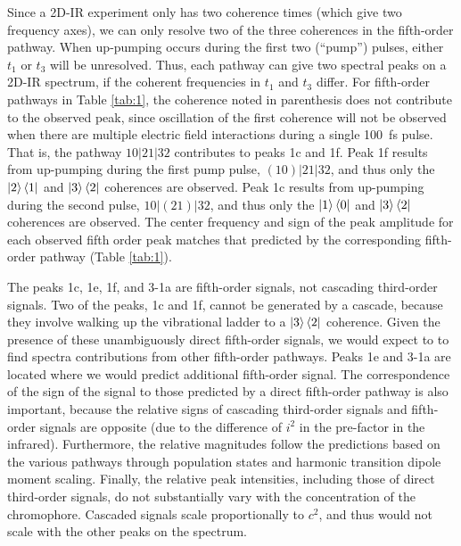 \documentclass[%
  class = book,%
  crop = false,%
  float = true,%
  multi = true,%
  preview = false,%
]{standalone}
\begin{document}
{Since a 2D-IR experiment only has two coherence times (which give two frequency axes), we can only resolve two of the three coherences in the fifth-order pathway. When up-pumping occurs during the first two (``pump'') pulses, either \(t_1\) or \(t_3\) will be unresolved. Thus, each pathway can give two spectral peaks on a 2D-IR spectrum, if the coherent frequencies in \(t_1\) and \(t_3\) differ.  For fifth-order pathways in Table \ref{tab:1}, the coherence noted in parenthesis does not contribute to the observed peak, since oscillation of the first coherence will not be observed when there are multiple electric field interactions during a single \SI{100}{\fs} pulse. That is, the pathway \(10|21|32\) contributes to peaks 1c and 1f. Peak 1f results from up-pumping during the first pump pulse, \(\left(10\right)|21|32\), and thus only the \(\ket{2}\bra{1}\) and \(\ket{3}\bra{2}\) coherences are observed. Peak 1c results from up-pumping during the second pulse, \(10|\left(21\right)|32\), and thus only the \(\ket{1}\bra{0}\) and \(\ket{3}\bra{2}\) coherences are observed. The center frequency and sign of the peak amplitude for each observed fifth order peak matches that predicted by the corresponding fifth-order pathway (Table \ref{tab:1}).

The peaks 1c, 1e, 1f, and 3-1a are fifth-order signals, not cascading third-order signals. Two of the peaks, 1c and 1f, cannot be generated by a cascade, because they involve walking up the vibrational ladder to a \(\ket{3}\bra{2}\) coherence. Given the presence of these unambiguously direct fifth-order signals, we would expect to to find spectra contributions from other fifth-order pathways. Peaks 1e and 3-1a are located where we would predict additional fifth-order signal. The correspondence of the sign of the signal to those predicted by a direct fifth-order pathway is also important, because the relative signs of cascading third-order signals and fifth-order signals are opposite (due to the difference of \(i^2\) in the pre-factor in the infrared). Furthermore, the relative magnitudes follow the predictions based on the various pathways through population states and harmonic transition dipole moment scaling.\cite{Garrett-Roe2009b} Finally, the relative peak intensities, including those of direct third-order signals, do not substantially vary with the concentration of the chromophore. Cascaded signals scale proportionally to \(c^2\), and thus would not scale with the other peaks on the spectrum.

}
\end{document}
